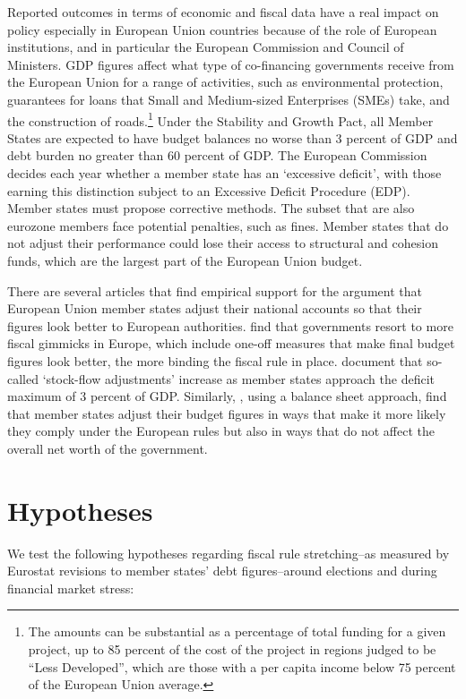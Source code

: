 \documentclass[]{article}
\begin{document}
Reported outcomes in terms of economic and fiscal data have a real impact on policy especially in European Union countries because of the role of European institutions, and in particular the European Commission and Council of Ministers. GDP figures affect what type of co-financing governments receive from the European Union for a range of activities, such as environmental protection, guarantees for loans that Small and Medium-sized Enterprises (SMEs) take, and the construction of roads.\footnote{The amounts can be substantial as a percentage of total funding for a given project, up to 85 percent of the cost of the project in regions judged to be “Less Developed”, which are those with a per capita income below 75 percent of the European Union average.} Under the Stability and Growth Pact, all Member States are expected to have budget balances no worse than 3 percent of GDP and debt burden no greater than 60 percent of GDP. The European Commission decides each year whether a member state has an `excessive deficit', with those earning this distinction subject to an Excessive Deficit Procedure (EDP). Member states must propose corrective methods. The subset that are also eurozone members face potential penalties, such as fines. Member states that do not adjust their performance could lose their access to structural and cohesion funds, which are the largest part of the European Union budget.

There are several articles that find empirical support for the argument that European Union member states adjust their national accounts so that their figures look better to European authorities. \cite{KoenNoord2005} find that governments resort to more fiscal gimmicks in Europe, which include one-off measures that make final budget figures look better, the more binding the fiscal rule in place. \cite{vonHagenWolff2006} document that so-called `stock-flow adjustments' increase as member states approach the  deficit maximum of 3 percent of GDP.  Similarly, \cite{MilesiMoriyama2006}, using a balance sheet approach, find that member states adjust their budget figures in ways that make it more likely they comply under the European rules but also in ways that do not affect the overall net worth of the government.

\section{Hypotheses}

We test the following hypotheses regarding fiscal rule stretching--as measured by Eurostat revisions to member states' debt figures--around elections and during financial market stress:
\end{document}
